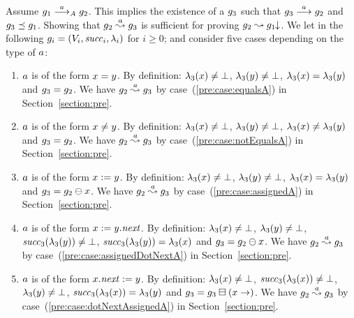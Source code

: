 %
Assume $g_1\stackrel{a}{\longrightarrow}_Ag_2$.
%
This implies the existence of a $g_3$ such that
$g_3\stackrel{a}{\longrightarrow}g_2$ 
and $g_3\preceq g_1$.
%
Showing that $g_2\stackrel{a}{\leadsto}g_3$
is sufficient for proving $g_2\stackrel{}{\leadsto}g_1\!\!\downarrow$.
%
%
We let in the following 
%
$g_i=\left(V_i,{\it succ}_i,\lambda_i\right)$ for $i\geq0$; 
and consider five cases depending on the type of $a$:
\begin{enumerate}
\item
  $a$ is of the form $x=y$. 
  By definition:
  $\lambda_3(x)\neq\bot$,
  $\lambda_3(y)\neq\bot$, 
  $\lambda_3(x)=\lambda_3(y)$ 
  and $g_3=g_2$.
  We have $g_2\stackrel{a}{\leadsto}g_3$ 
  by case~(\ref{pre:case:equalsA}) in Section~\ref{section:pre}.
\item
  $a$ is of the form $x\neq y$.
%
  By definition:
  $\lambda_3(x)\neq\bot$, 
  $\lambda_3(y)\neq\bot$, 
  $\lambda_3(x)\neq\lambda_3(y)$ 
  and $g_3=g_2$.
  We have $g_2\stackrel{a}{\leadsto}g_3$ 
  by case~(\ref{pre:case:notEqualsA}) in Section~\ref{section:pre}.
\item
  $a$ is of the form $x:=y$.
  By definition: 
  $\lambda_3(x)\neq\bot$,
  $\lambda_3(y)\neq\bot$, 
  $\lambda_3(x)=\lambda_3(y)$ and
  $g_3=g_2\ominus{\ensuremath{x}}$.
  We have $g_2\stackrel{a}{\leadsto}g_3$ 
  by case~(\ref{pre:case:assignedA}) in Section~\ref{section:pre}.
\item
$a$ is of the form  $x:=y.{\it next}$.
  By definition:
  $\lambda_3(x)\neq\bot$, %
  $\lambda_3(y)\neq\bot$, %
  ${\it succ}_3(\lambda_3(y))\neq\bot$, %
  ${\it succ}_3(\lambda_3(y))=\lambda_3(x)$ and
  $g_3=g_2\ominus{\ensuremath{x}}$.
  We have $g_2\stackrel{a}{\leadsto}g_3$ 
  by case~(\ref{pre:case:assignedDotNextA}) in Section~\ref{section:pre}.
\item
$a$ is of the form $x.{\it next}:=y$.
  By definition:
  $\lambda_3(x)\neq\bot$, %
  ${\it succ}_3(\lambda_3(x))\neq\bot$, %
  $\lambda_3(y)\neq\bot$, %
  ${\it succ}_3(\lambda_3(x))=\lambda_3(y)$ and
  $g_3=g_3\boxminus({x}\rightarrow)$.
  We have $g_2\stackrel{a}{\leadsto}g_3$ 
  by case~(\ref{pre:case:dotNextAssignedA}) in Section~\ref{section:pre}.
\end{enumerate}

%



